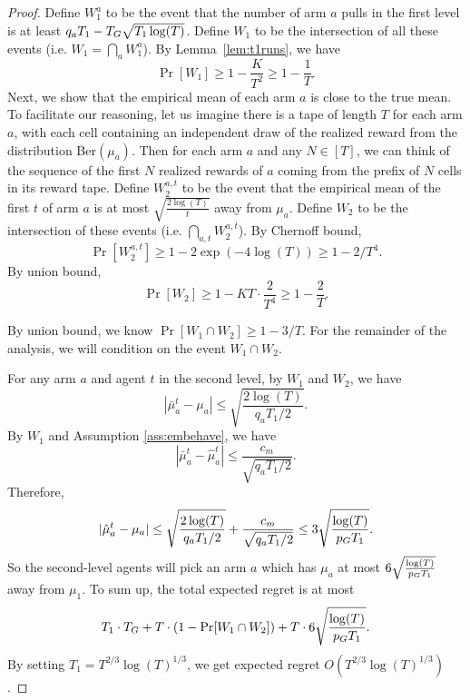 \begin{proof}
  Define $W_1^a$ to be the event that the number of arm $a$ pulls in
  the first level is at least $q_a T_1- T_G \sqrt{T_1\log(T)}$.
Define $W_1$ to be the intersection of all these events (i.e. $W_1 = \bigcap_{a}W_1^a$). By Lemma~\ref{lem:t1runs}, we have
\[
\Pr[W_1] \geq 1- \frac{K}{T^2} \geq 1 - \frac{1}{T}.
\]
  Next, we show that the empirical mean of
each arm $a$ is close to the true mean. To facilitate our reasoning,
let us imagine there is a tape of length $T$ for each arm $a$, with
each cell containing an independent draw of the realized reward from
the distribution Ber$(\mu_a)$. Then for each arm $a$ and any
$N\in [T]$, we can think of the sequence of the first $N$ realized
rewards of $a$ coming from the prefix of $N$ cells in its reward
tape. Define $W^{a,t}_2$ to be the event that the empirical mean of
the first $t$  of arm $a$ is at
most $\sqrt{\frac{2\log(T)}{t}}$ away from $\mu_a$. Define $W_2$ to be
the intersection of these events (i.e.  $\bigcap_{a,t} W^{a,t}_2$).
By Chernoff bound,
\[
\Pr[W^{a,t}_2] \geq 1 - 2\exp(-4\log(T)) \geq 1-2/T^4.
\]
By union bound, 
\[
\Pr[W_2] \geq 1 - KT \cdot \frac{2}{T^4} \geq 1 - \frac{2}{T}.
\]



By union bound, we know $\Pr[W_1 \cap W_2] \geq 1 - 3/T$. For the
remainder of the analysis, we will condition on the event
$W_1 \cap W_2$.

For any arm $a$ and agent $t$ in the second level, by $W_1$ and $W_2$, we have
\[
|\bar{\mu}^t_a - \mu_a| \leq \sqrt{\frac{2\log(T)}{q_aT_1 /2}}.
\]
By $W_1$ and Assumption \ref{ass:embehave}, we have
\[
|\bar{\mu}^t_a - \hat{\mu}^t_a| \leq \frac{c_m}{\sqrt{q_aT_1/2}}.
\]
Therefore,
\[
|\hat{\mu}^t_a - \mu_a|\leq \sqrt{\frac{2\log(T)}{q_aT_1 /2}}+\frac{c_m}{\sqrt{q_aT_1/2}} \leq 3 \sqrt{\frac{\log(T)}{p_G T_1 }}.
\]
So the second-level agents will pick an arm $a$ which has $\mu_a$ at most $6 \sqrt{\frac{\log(T)}{p_G T_1 }}$ away from $\mu_1$. To sum up, the total expected regret is at most 
\[
T_1 \cdot T_G + T \cdot (1-\Pr[W_1 \cap W_2]) + T \cdot  6 \sqrt{\frac{\log(T)}{p_G T_1 }}.
\]
By setting $T_1 = T^{2/3}\log(T)^{1/3}$, we get expected regret $O(T^{2/3}\log(T)^{1/3})$.


\end{proof}
